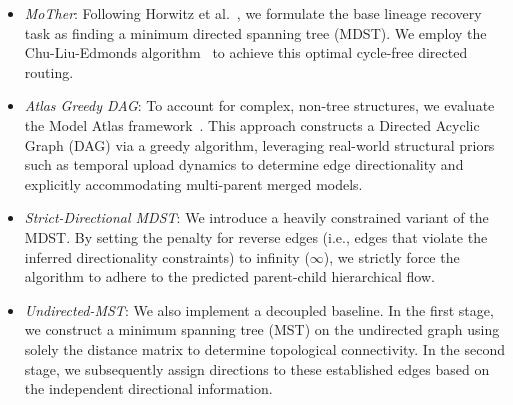 \begin{itemize}[leftmargin=*]
    \item \textit{MoTher}: Following Horwitz et al.~\cite{horwitz2024unsupervised}, we formulate the base lineage recovery task as finding a minimum directed spanning tree (MDST). We employ the Chu-Liu-Edmonds algorithm~\cite{chu1965shortest, edmonds1967optimum} to achieve this optimal cycle-free directed routing.
    \item \textit{Atlas Greedy DAG}: To account for complex, non-tree structures, we evaluate the Model Atlas framework~\cite{horwitz2025we}. This approach constructs a Directed Acyclic Graph (DAG) via a greedy algorithm, leveraging real-world structural priors such as temporal upload dynamics to determine edge directionality and explicitly accommodating multi-parent merged models.
    \item \textit{Strict-Directional MDST}: We introduce a heavily constrained variant of the MDST. By setting the penalty for reverse edges (i.e., edges that violate the inferred directionality constraints) to infinity ($\infty$), we strictly force the algorithm to adhere to the predicted parent-child hierarchical flow.
    \item \textit{Undirected-MST}: We also implement a decoupled baseline. In the first stage, we construct a minimum spanning tree (MST) on the undirected graph using solely the distance matrix to determine topological connectivity. In the second stage, we subsequently assign directions to these established edges based on the independent directional information.
\end{itemize}